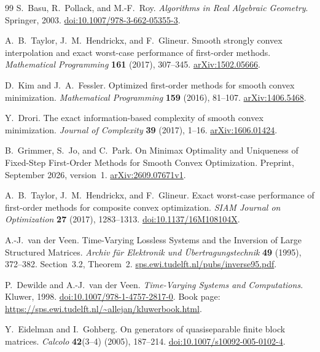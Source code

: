 \documentclass[11pt]{article}
\numberwithin{equation}{section}
\theoremstyle{definition}
\begin{document}
\begin{thebibliography}{99}
S.~Basu, R.~Pollack, and M.-F.~Roy.
\emph{Algorithms in Real Algebraic Geometry}.
Springer, 2003.
\href{https://doi.org/10.1007/978-3-662-05355-3}{doi:10.1007/978-3-662-05355-3}.

A.~B.~Taylor, J.~M.~Hendrickx, and F.~Glineur.
Smooth strongly convex interpolation and exact worst-case performance of first-order methods.
\emph{Mathematical Programming} \textbf{161} (2017), 307--345.
\href{https://arxiv.org/abs/1502.05666}{arXiv:1502.05666}.

D.~Kim and J.~A.~Fessler.
Optimized first-order methods for smooth convex minimization.
\emph{Mathematical Programming} \textbf{159} (2016), 81--107.
\href{https://arxiv.org/abs/1406.5468}{arXiv:1406.5468}.

Y.~Drori.
The exact information-based complexity of smooth convex minimization.
\emph{Journal of Complexity} \textbf{39} (2017), 1--16.
\href{https://arxiv.org/abs/1606.01424}{arXiv:1606.01424}.

B.~Grimmer, S.~Jo, and C.~Park.
On Minimax Optimality and Uniqueness of Fixed-Step First-Order Methods for Smooth Convex Optimization.
Preprint, September 2026, version~1.
\href{https://arxiv.org/abs/2609.07671v1}{arXiv:2609.07671v1}.

A.~B.~Taylor, J.~M.~Hendrickx, and F.~Glineur.
Exact worst-case performance of first-order methods for composite convex optimization.
\emph{SIAM Journal on Optimization} \textbf{27} (2017), 1283--1313.
\href{https://doi.org/10.1137/16M108104X}{doi:10.1137/16M108104X}.

A.-J.~van der Veen.
Time-Varying Lossless Systems and the Inversion of Large Structured Matrices.
\emph{Archiv f\"ur Elektronik und \"Ubertragungstechnik} \textbf{49} (1995), 372--382.
Section~3.2, Theorem~2.
\href{https://sps.ewi.tudelft.nl/pubs/inverse95.pdf}{sps.ewi.tudelft.nl/pubs/inverse95.pdf}.

P.~Dewilde and A.-J.~van der Veen.
\emph{Time-Varying Systems and Computations}.
Kluwer, 1998.
\href{https://doi.org/10.1007/978-1-4757-2817-0}{doi:10.1007/978-1-4757-2817-0}.
Book page: \url{https://sps.ewi.tudelft.nl/~allejan/kluwerbook.html}.

Y.~Eidelman and I.~Gohberg.
On generators of quasiseparable finite block matrices.
\emph{Calcolo} \textbf{42}(3--4) (2005), 187--214.
\href{https://doi.org/10.1007/s10092-005-0102-4}{doi:10.1007/s10092-005-0102-4}.


\end{thebibliography}
\end{document}
